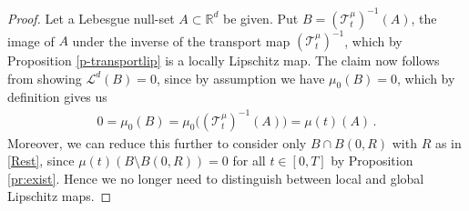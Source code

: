 \documentclass[A4paper,11pt]{article}
\theoremstyle{definition}
\newcommand{\R}{\mathbb{R}}
\newcommand{\cl}{\mathcal{L}}
\newcommand{\ct}{\mathcal{T}}
\begin{document}
\begin{proof}
%	
%	

	Let a Lebesgue null-set $A\subset\R^d$ be given. Put $B=(\ct^\mu_t)^{-1}(A)$,
	the image of $A$ under the inverse of the transport map $(\ct^\mu_t)^{-1}$, which by Proposition \ref{p-transportlip} is a locally Lipschitz map. The claim now follows from showing $\cl^d(B)=0$,
	since by assumption we have $\mu_0(B)=0$, which by definition gives us
	\begin{align*}
		0=\mu_0(B)=\mu_0\bigl((\ct^\mu_t)^{-1}(A)\bigr) = \mu(t)(A)\,.
	\end{align*}
	Moreover, we can reduce this further to consider only $B\cap B(0,R)$ with $R$ as in
	\eqref{Rest}, since $\mu(t)(B\setminus B(0,R))=0$ for all $t \in [0,T]$ by Proposition \ref{pr:exist}. Hence we no longer need to distinguish
	between local and global Lipschitz maps.
	

\end{proof}
\end{document}
